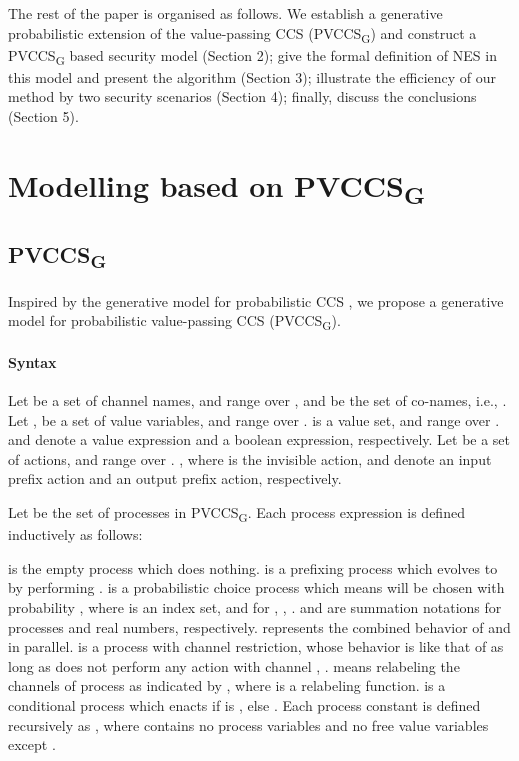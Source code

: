\documentclass[10pt, conference, compsocconf]{IEEEtran}
\begin{document}
The rest of the paper is organised as follows.
We establish a generative probabilistic extension of the value-passing CCS (PVCCS\textsubscript{G}) and construct a PVCCS\textsubscript{G} based security model (Section 2);
give the formal definition of NES in this model and present the algorithm (Section 3);
illustrate the efficiency of our method by two security scenarios (Section 4);
finally, discuss the conclusions (Section 5).

\section{Modelling based on PVCCS\textsubscript{G}}
\newtheorem{definition}{Definition}[section]
\newtheorem{Theorem}{Theorem}[section]
\newtheorem{Lemma}{Lemma}[section]


\subsection{ PVCCS\textsubscript{G}}
Inspired by the generative model for probabilistic CCS \cite{rob}, we propose a generative model for probabilistic value-passing CCS (PVCCS\textsubscript{G}).
\paragraph{Syntax}
Let  be a set of channel names, and  range over , and  be the set of co-names, i.e., .
Let ,  be a set of value variables, and  range over .    is a value set, and  range over .
 and  denote a value expression and a boolean expression, respectively.
Let  be a set of actions, and  range over . , where  is the invisible action,  and  denote an input prefix action and an output prefix action, respectively.


Let  be the set of processes in PVCCS\textsubscript{G}. Each process expression  is defined inductively as follows:

 is the empty process which does nothing.
 is a prefixing process which evolves to  by performing .
 is a probabilistic choice process which means  will be chosen with probability , where  is an index set, and for , , .  and  are summation notations for processes and real numbers, respectively.
 represents the combined behavior of  and  in parallel.
 is a process with channel restriction, whose behavior is like that of  as long as  does not perform any action with channel , .
 means relabeling the channels of process  as indicated by , where  is a relabeling function.
 is a conditional process which enacts  if  is , else .
Each process constant  is defined recursively as , where  contains no process variables and no free value variables except .
\end{document}
